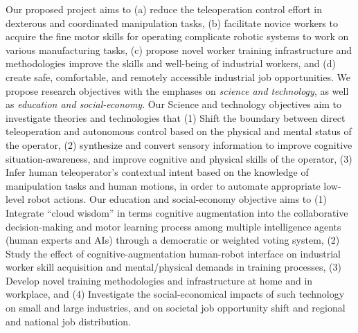 Our proposed project aims to (a) reduce the teleoperation control effort in dexterous and coordinated manipulation tasks, (b) facilitate novice workers to acquire the fine motor skills for operating complicate robotic systems to work on various manufacturing tasks, (c) propose novel worker training infrastructure and methodologies improve the skills and well-being of industrial workers, and (d) create safe, comfortable, and remotely accessible industrial job opportunities. We propose research objectives with the emphases on \textit{science and technology}, as well as \textit{education and social-economy}. Our Science and technology objectives aim to investigate theories and technologies that (1) Shift the boundary between direct teleoperation and autonomous control based on the physical and mental status of the operator, (2) synthesize and convert sensory information to improve cognitive situation-awareness, and improve cognitive and physical skills of the operator, (3) Infer human teleoperator's contextual intent based on the knowledge of manipulation tasks and human motions, in order to automate appropriate low-level robot actions. Our education and social-economy objective aims to (1) Integrate ``cloud wisdom'' in terms cognitive augmentation into the collaborative decision-making and motor learning process among multiple intelligence agents (human experts and AIs) through a democratic or weighted voting system, (2) Study the effect of cognitive-augmentation human-robot interface on industrial worker skill acquisition and mental/physical demands in training processes, (3) Develop novel training methodologies and infrastructure at home and in workplace, and (4) Investigate the social-economical impacts of such technology on small and large industries, and on societal job opportunity shift and regional and national job distribution.  

\vspace{0.5 em}

